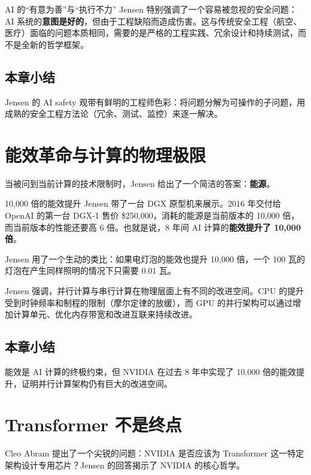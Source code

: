 \documentclass[a4paper]{article}
\begin{document}
\begin{warningbox}{AI 的``有意为善''与``执行不力''}
Jensen 特别强调了一个容易被忽视的安全问题：AI 系统的\textbf{意图是好的}，但由于工程缺陷而造成伤害。这与传统安全工程（航空、医疗）面临的问题本质相同，需要的是严格的工程实践、冗余设计和持续测试，而不是全新的哲学框架。
\end{warningbox}

\subsection{本章小结}
Jensen 的 AI safety 观带有鲜明的工程师色彩：将问题分解为可操作的子问题，用成熟的安全工程方法论（冗余、测试、监控）来逐一解决。

\section{能效革命与计算的物理极限}

当被问到当前计算的技术限制时，Jensen 给出了一个简洁的答案：\textbf{能源}。

\begin{importantbox}{10,000 倍的能效提升}
Jensen 带了一台 DGX 原型机来展示。2016 年交付给 OpenAI 的第一台 DGX-1 售价 \$250,000，消耗的能源是当前版本的 10,000 倍，而当前版本的性能还要高 6 倍。也就是说，8 年间 AI 计算的\textbf{能效提升了 10,000 倍}。

Jensen 用了一个生动的类比：如果电灯泡的能效也提升 10,000 倍，一个 100 瓦的灯泡在产生同样照明的情况下只需要 0.01 瓦。
\end{importantbox}

Jensen 强调，并行计算与串行计算在物理层面上有不同的改进空间。CPU 的提升受到时钟频率和制程的限制（摩尔定律的放缓），而 GPU 的并行架构可以通过增加计算单元、优化内存带宽和改进互联来持续改进。

\subsection{本章小结}
能效是 AI 计算的终极约束，但 NVIDIA 在过去 8 年中实现了 10,000 倍的能效提升，证明并行计算架构仍有巨大的改进空间。

\section{Transformer 不是终点}

Cleo Abram 提出了一个尖锐的问题：NVIDIA 是否应该为 Transformer 这一特定架构设计专用芯片？Jensen 的回答揭示了 NVIDIA 的核心哲学。
\end{document}
